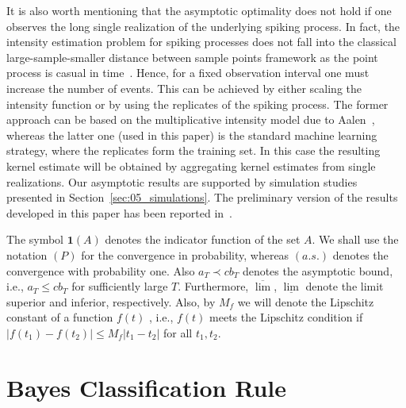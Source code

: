 \documentclass[lettersize,journal,onecolumn]{IEEEtran}
\theoremstyle{definition}
\newcommand{\indicator}[1]{{\mathbf{1}}\left( #1 \right)}
\begin{document}
It is also worth mentioning that the asymptotic optimality does not hold if one observes 
the long single realization of the underlying spiking process. In fact, the intensity 
estimation problem for spiking processes does not fall into the classical 
large-sample-smaller distance between sample points framework as the point process is 
casual in time~\cite{diggle1988equivalence}. Hence, for a fixed observation interval 
one must increase the number of events. This can be achieved by either scaling the 
intensity function or by using the replicates of the spiking process. The former 
approach can be based on the multiplicative intensity model due to 
Aalen~\cite{aalen1978nonparametric}, whereas the latter one (used in this paper) is 
the standard machine learning strategy, where the replicates form the training set. In 
this case the resulting kernel estimate will be obtained by aggregating kernel 
estimates from single realizations. Our asymptotic results are supported by 
simulation studies presented in Section~\ref{sec:05_simulations}. The preliminary
version of the results developed in this paper has been reported
in~\cite{pawlak2023asymptotically}.

The symbol $\indicator{A}$ denotes the indicator function of the set $A$. We shall use 
the notation $(P)$ for the convergence in probability, whereas $(a.s.)$ denotes the 
convergence with probability one. Also $a_{T} \prec cb_{T}$ denotes the asymptotic 
bound, i.e., $a_{T} \leq cb_{T}$ for sufficiently large $T$. Furthermore, 
$\overline{\lim}$, $\underline{\lim}$ denote the limit superior and inferior,
respectively.  Also, by $M_f$ we will denote the Lipschitz constant of a function
$f(t)$ , i.e., $f(t)$ meets the Lipschitz condition if
$|f(t_1) - f(t_2)| \leq M_f |t_1-t_2|$ for all $t_1,t_2$.

\section{Bayes Classification Rule}
\label{sec:02_bayes_rule}
\end{document}
